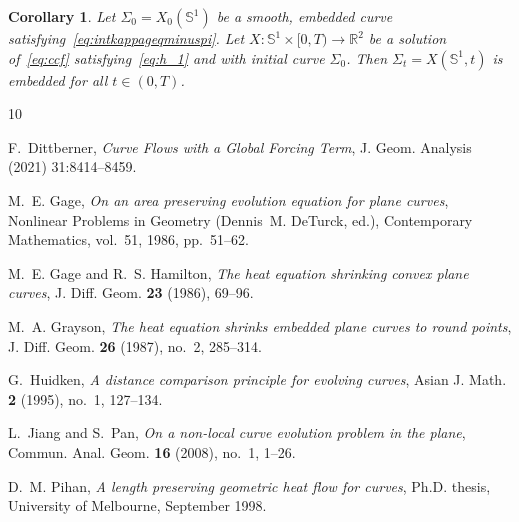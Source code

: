 \documentclass[reqno]{amsart}
\newtheorem{Cor}[Thm]{Corollary}
\theoremstyle{definition}
\def\R{\mathbb{R}}
\def\Si{\Sigma}
\def\Sp{\Sph^1}
\def\Sph{\mathbb{S}}
\def\St{\Si_t}
\begin{document}
\begin{Cor}
\label{cor:embeddedness}
Let $\Si_0=X_0(\Sp)$ be a smooth, embedded curve satisfying~\eqref{eq:intkappageqminuspi}.
Let $X:\Sp\!\times[0,T)\to\R^2$ be a solution of~\eqref{eq:ccf} satisfying~\eqref{eq:h_1} and with initial curve $\Si_0$.
Then $\St=X(\Sp\!,t)$ is embedded for all $t\in(0,T)$.
\end{Cor}


\providecommand{\bysame}{\leavevmode\hbox to3em{\hrulefill}\thinspace}
\providecommand{\MR}{\relax\ifhmode\unskip\space\fi MR }
\providecommand{\MRhref}[2]{%
  \href{http://www.ams.org/mathscinet-getitem?mr=#1}{#2}
}
\providecommand{\href}[2]{#2}
\begin{thebibliography}{10}

F.~Dittberner, \emph{Curve Flows with a Global Forcing Term}, 
J. Geom. Analysis (2021) 31:8414--8459.

M.~E. Gage, 
\emph{On an area preserving evolution equation for plane curves},
Nonlinear Problems in Geometry (Dennis~M. DeTurck, ed.), Contemporary
 Mathematics, vol.~51, 1986, pp.~51--62.

M.~E. Gage and R.~S. Hamilton, \emph{The heat equation shrinking convex plane
  curves}, J. Diff. Geom. \textbf{23} (1986), 69--96.

M.~A. Grayson, \emph{The heat equation shrinks embedded plane curves to round
  points}, J. Diff. Geom. \textbf{26} (1987), no.~2, 285--314.

G.~Huidken, \emph{A distance comparison principle for evolving curves}, Asian J.
  Math. \textbf{2} (1995), no.~1, 127--134.

L.~Jiang and S.~Pan, 
\emph{On a non-local curve evolution problem in the plane}, 
Commun. Anal. Geom. \textbf{16} (2008), no.~1, 1--26.

D.~M. Pihan, \emph{A length preserving geometric heat flow for curves}, Ph.D.
  thesis, University of Melbourne, September 1998.

\end{thebibliography}
 
\end{document}

